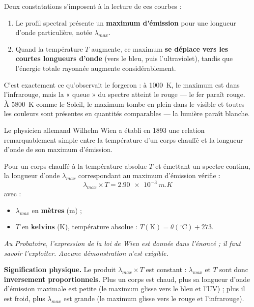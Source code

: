 \documentclass[11pt]{article}
\newcommand{\cle}[1]{{\popxbold\color{popdark}#1}}
\newcounter{popsec}
\newcounter{popsub}
\newcommand{\courssub}[1]{%
  \stepcounter{popsub}%
  \par\vspace{9pt}\noindent{\popxbold\fontsize{11.5}{13}\selectfont\color{popink}{\color{poporange}\thepopsec.\thepopsub}\hspace{6pt}#1}\par\nopagebreak\vspace{4pt}
}
\begin{document}
Deux constatations s'imposent à la lecture de ces courbes :

\begin{enumerate}
\item Le profil spectral présente un \textbf{maximum d'émission} pour une longueur d'onde particulière, notée $\lambda_{max}$.
\item Quand la température $T$ augmente, ce maximum \textbf{se déplace vers les courtes longueurs d'onde} (vers le bleu, puis l'ultraviolet), tandis que l'énergie totale rayonnée augmente considérablement.
\end{enumerate}

C'est exactement ce qu'observait le forgeron : à \SI{1000}{K}, le maximum est dans l'infrarouge, mais la « queue » du spectre atteint le rouge — le fer paraît rouge. À \SI{5800}{K} comme le Soleil, le maximum tombe en plein dans le visible et toutes les couleurs sont présentes en quantités comparables — la lumière paraît blanche.

\courssub{La loi de Wien}

Le physicien allemand Wilhelm Wien a établi en 1893 une relation remarquablement simple entre la température d'un corps chauffé et la longueur d'onde de son maximum d'émission.

\begin{propriete}
Pour un corps chauffé à la température absolue $T$ et émettant un spectre continu, la longueur d'onde $\lambda_{max}$ correspondant au maximum d'émission vérifie :
\[ \lambda_{max} \times T = \num{2,90e-3} \ \si{m.K} \]
avec :
\begin{itemize}
\item $\lambda_{max}$ en \textbf{mètres} (m) ;
\item $T$ en \textbf{kelvins} (K), température absolue : $T(\text{K}) = \theta(^\circ\text{C}) + 273$.
\end{itemize}
\emph{Au Probatoire, l'expression de la loi de Wien est donnée dans l'énoncé ; il faut savoir l'exploiter. Aucune démonstration n'est exigible.}
\end{propriete}

\textbf{Signification physique.} Le produit $\lambda_{max} \times T$ est constant : $\lambda_{max}$ et $T$ sont donc \textbf{inversement proportionnels}. Plus un corps est \cle{chaud}, plus sa longueur d'onde d'émission maximale est \cle{petite} (le maximum glisse vers le bleu et l'UV) ; plus il est froid, plus $\lambda_{max}$ est grande (le maximum glisse vers le rouge et l'infrarouge).
\end{document}
